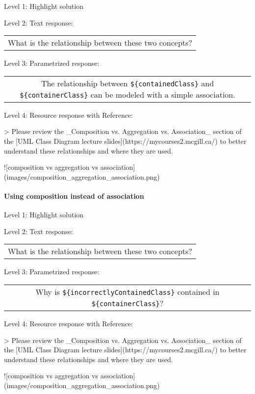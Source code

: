 \noindent Level 1: Highlight solution \medskip

\noindent Level 2: Text response: \medskip

\begin{tabular}{|c}
What is the relationship between these two concepts?
\end{tabular} \medskip

\noindent Level 3: Parametrized response: \medskip

\begin{tabular}{|c}
The relationship between \verb|${containedClass}| and \verb|${containerClass}| can be modeled with a simple association.
\end{tabular} \medskip

\noindent Level 4: Resource response with Reference:

> Please review the _Composition vs. Aggregation vs. Association_ section of 
the [UML Class Diagram lecture slides](https://mycourses2.mcgill.ca/) to 
better understand these relationships and where they are used.

![composition vs aggregation vs association](images/composition_aggregation_association.png)


\paragraph{Using composition instead of association}

\noindent Level 1: Highlight solution \medskip

\noindent Level 2: Text response: \medskip

\begin{tabular}{|c}
What is the relationship between these two concepts?
\end{tabular} \medskip

\noindent Level 3: Parametrized response: \medskip

\begin{tabular}{|c}
Why is \verb|${incorrectlyContainedClass}| contained in \verb|${containerClass}|?
\end{tabular} \medskip

\noindent Level 4: Resource response with Reference:

> Please review the _Composition vs. Aggregation vs. Association_ section of 
the [UML Class Diagram lecture slides](https://mycourses2.mcgill.ca/) to 
better understand these relationships and where they are used.

![composition vs aggregation vs association](images/composition_aggregation_association.png)


